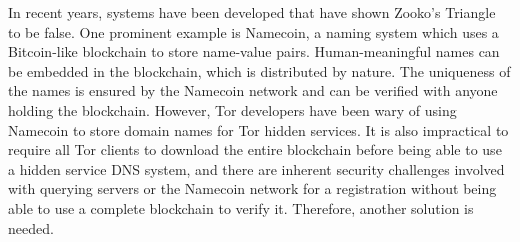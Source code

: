 In recent years, systems have been developed that have shown Zooko's Triangle to be false. One prominent example is Namecoin, a naming system which uses a Bitcoin-like blockchain to store name-value pairs. Human-meaningful names can be embedded in the blockchain, which is distributed by nature. The uniqueness of the names is ensured by the Namecoin network and can be verified with anyone holding the blockchain. However, Tor developers have been wary of using Namecoin to store domain names for Tor hidden services. It is also impractical to require all Tor clients to download the entire blockchain before being able to use a hidden service DNS system, and there are inherent security challenges involved with querying servers or the Namecoin network for a registration without being able to use a complete blockchain to verify it. Therefore, another solution is needed.